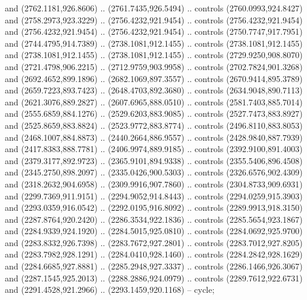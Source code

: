 \begin{scope}[shift={(19.44451,-318.97965)}]
\begin{scope}[shift={(-2093.8013,-1176.4989)}]
\begin{scope}
\begin{scope}
\begin{scope}[cm={{0.24383,0.0,0.0,0.24383,(2162.0441,1469.7571)}}]
            and (2762.1181,926.8606) .. (2761.7435,926.5494) .. controls
            (2760.0993,924.8427) and (2758.2973,923.3229) .. (2756.4232,921.9454) ..
            controls (2756.4232,921.9454) and (2756.4232,921.9454) .. (2756.4232,921.9454)
            .. controls (2750.7747,917.7951) and (2744.4795,914.7389) ..
            (2738.1081,912.1455) .. controls (2738.1081,912.1455) and (2738.1081,912.1455)
            .. (2738.1081,912.1455) .. controls (2729.9250,908.8070) and
            (2721.4798,906.2215) .. (2712.9759,903.9958) .. controls (2702.7824,901.3268)
            and (2692.4652,899.1896) .. (2682.1069,897.3557) .. controls
            (2670.9414,895.3789) and (2659.7223,893.7423) .. (2648.4703,892.3680) ..
            controls (2634.9048,890.7113) and (2621.3076,889.2827) .. (2607.6965,888.0510)
            .. controls (2581.7403,885.7014) and (2555.6859,884.1276) ..
            (2529.6203,883.9085) .. controls (2527.7473,883.8927) and (2525.8659,883.8824)
            .. (2523.9772,883.8774) .. controls (2496.8110,883.8053) and
            (2468.1007,884.8873) .. (2440.2664,886.9557) .. controls (2428.9840,887.7939)
            and (2417.8383,888.7781) .. (2406.9974,889.9185) .. controls
            (2392.9100,891.4003) and (2379.3177,892.9723) .. (2365.9101,894.9338) ..
            controls (2355.5406,896.4508) and (2345.2750,898.2097) .. (2335.0426,900.5303)
            .. controls (2326.6576,902.4309) and (2318.2632,904.6958) ..
            (2309.9916,907.7860) .. controls (2304.8733,909.6931) and (2299.7369,911.9151)
            .. (2294.9052,914.8443) .. controls (2294.0259,915.3903) and
            (2293.0359,916.0542) .. (2292.0195,916.8092) .. controls (2289.9913,918.3150)
            and (2287.8764,920.2420) .. (2286.3534,922.1836) .. controls
            (2285.5654,923.1867) and (2284.9339,924.1920) .. (2284.5015,925.0810) ..
            controls (2284.0692,925.9700) and (2283.8332,926.7398) .. (2283.7672,927.2801)
            .. controls (2283.7012,927.8205) and (2283.7982,928.1291) ..
            (2284.0410,928.1460) .. controls (2284.2842,928.1629) and (2284.6685,927.8881)
            .. (2285.2948,927.3337) .. controls (2286.1466,926.3067) and
            (2287.1545,925.2013) .. (2288.2886,924.0979) .. controls (2289.7612,922.6731)
            and (2291.4528,921.2966) .. (2293.1459,920.1168) -- cycle;


\end{scope}
\end{scope}
\end{scope}
\end{scope}
\end{scope}

